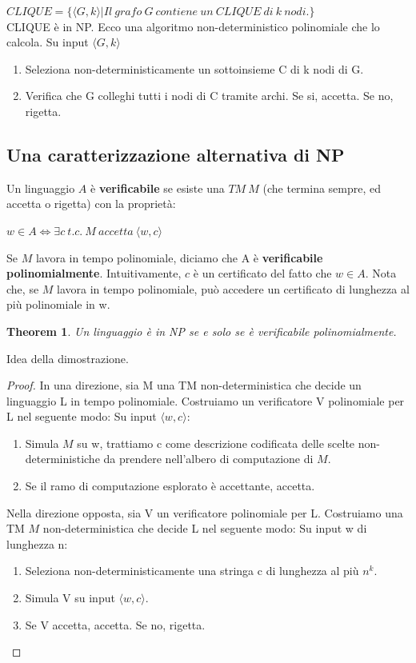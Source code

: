 \documentclass[a4paper, 12pt]{article}
\newtheorem{theorem}{Theorem}[section]
\begin{document}
$CLIQUE = \{\langle G, k \rangle | Il\ grafo\ G\ contiene\ un\ CLIQUE\ di\ k\ nodi.\}$\\
CLIQUE \`e in NP. Ecco una algoritmo non-deterministico polinomiale che lo calcola. Su input $\langle G, k \rangle$

\begin{enumerate}
\item Seleziona non-deterministicamente un sottoinsieme C di k nodi di G.
\item Verifica che G colleghi tutti i nodi di C tramite archi. Se si, accetta. Se no, rigetta.
\end{enumerate}

\subsection{Una caratterizzazione alternativa di NP}
Un linguaggio $A$ \`e \textbf{verificabile} se esiste una $TM\ M$ (che termina sempre, ed accetta o rigetta) con la propriet\`a:
\begin{center}
$w \in A \iff \exists c\ t.c.\ M\ accetta\ \langle w,c \rangle$
\end{center}
Se $M$ lavora in tempo polinomiale, diciamo che A \`e \textbf{verificabile polinomialmente}. Intuitivamente, $c$ \`e un certificato del fatto che $w \in A$. Nota che, se $M$ lavora in tempo polinomiale, pu\`o accedere un certificato di lunghezza al pi\`u polinomiale in w.

\begin{theorem}
Un linguaggio \`e in NP se e solo se \`e verificabile polinomialmente.
\end{theorem}
Idea della dimostrazione.
\begin{proof}
In una direzione, sia M una TM non-deterministica che decide un linguaggio L in tempo polinomiale. Costruiamo un verificatore V polinomiale per L nel seguente modo: Su input $\langle w,c \rangle$:
\begin{enumerate}
\item Simula $M$ su w, trattiamo c come descrizione codificata delle scelte non-deterministiche da prendere nell'albero di computazione di $M$.
\item Se il ramo di computazione esplorato \`e accettante, accetta.
\end{enumerate}
Nella direzione opposta, sia V un verificatore polinomiale per L. Costruiamo una TM $M$ non-deterministica che decide L nel seguente modo: Su input w di lunghezza n:
\begin{enumerate}
\item Seleziona non-deterministicamente una stringa c di lunghezza al pi\`u $n^{k}$.
\item Simula V su input $\langle w, c \rangle$.
\item Se V accetta, accetta. Se no, rigetta.
\end{enumerate}
\end{proof}
\end{document}
